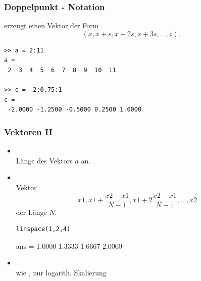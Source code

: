 \documentclass[hyperref={xetex}]{beamer}
\begin{document}
%
%
\begin{frame}[fragile]\frametitle{Doppelpunkt - Notation}
 erzeugt einen Vektor der Form 
\[ (x,x+s,x+2s,x+3s, \ldots , z). \]
\begin{lstlisting}
>> a = 2:11
a =
 2  3  4  5  6  7  8  9  10  11

>> c = -2:0.75:1
c =
 -2.0000 -1.2500 -0.5000 0.2500 1.0000
\end{lstlisting}
\end{frame} 

%
%
\begin{frame}[fragile]\frametitle{Vektoren II}
\begin{itemize}
\item {}\\ Länge des Vektors $a$ an.
\item {}\\ Vektor
\[ x1, x1+\frac{x2-x1}{N-1}, x1+2 \frac{x2-x1}{N-1}, \dots ,x2  \]
der Länge $N$.
\begin{lstlisting}
linspace(1,2,4)
\end{lstlisting}
\begin{matlab}
ans =
    1.0000    1.3333    1.6667    2.0000 
\end{matlab}

\item {}\\ wie , nur logarith. Skalierung
\end{itemize}
\end{frame}
\end{document}
